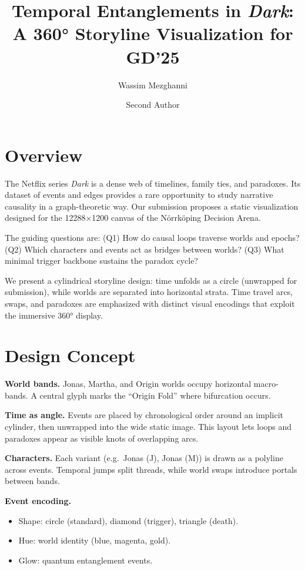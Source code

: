 \documentclass[a4paper,UKenglish]{lipics-v2021}
\title{Temporal Entanglements in \emph{Dark}: A 360° Storyline Visualization for GD'25}
\author{Wassim Mezghanni}{Technical University of Munich, Germany}{email}{[orcid]}{}
\author{Second Author}{Affiliation, Country}{email}{[orcid]}{}
\begin{document}
\maketitle

\section*{Overview}
The Netflix series \emph{Dark} is a dense web of timelines, family ties, and paradoxes. Its dataset of events and edges provides a rare opportunity to study narrative causality in a graph-theoretic way. Our submission proposes a static visualization designed for the 12288$\times$1200 canvas of the Nörrköping Decision Arena.  

The guiding questions are:  
(Q1) How do causal loops traverse worlds and epochs?  
(Q2) Which characters and events act as bridges between worlds?  
(Q3) What minimal trigger backbone sustains the paradox cycle?  

We present a cylindrical storyline design: time unfolds as a circle (unwrapped for submission), while worlds are separated into horizontal strata. Time travel arcs, swaps, and paradoxes are emphasized with distinct visual encodings that exploit the immersive 360° display.

\section*{Design Concept}
\textbf{World bands.} Jonas, Martha, and Origin worlds occupy horizontal macro-bands. A central glyph marks the ``Origin Fold'' where bifurcation occurs.  

\textbf{Time as angle.} Events are placed by chronological order around an implicit cylinder, then unwrapped into the wide static image. This layout lets loops and paradoxes appear as visible knots of overlapping arcs.  

\textbf{Characters.} Each variant (e.g.\ Jonas (J), Jonas (M)) is drawn as a polyline across events. Temporal jumps split threads, while world swaps introduce portals between bands.  

\textbf{Event encoding.}  
\begin{itemize}
  \item Shape: circle (standard), diamond (trigger), triangle (death).  
  \item Hue: world identity (blue, magenta, gold).  
  \item Glow: quantum entanglement events.  
\end{itemize}
\end{document}
